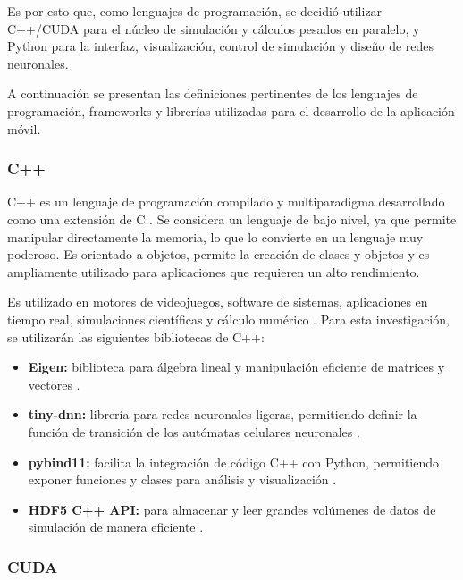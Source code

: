 Es por esto que, como lenguajes de programación, se decidió utilizar C++/CUDA para el núcleo de simulación y cálculos pesados en paralelo, y Python para la interfaz, visualización, control de simulación y diseño de redes neuronales. 

A continuación se presentan las definiciones pertinentes de los lenguajes de programación, frameworks y librerías utilizadas para el desarrollo de la aplicación móvil.

\subsubsection{C++}

C++ es un lenguaje de programación compilado y multiparadigma desarrollado como una extensión de C \cite{c_1}. Se considera un lenguaje de bajo nivel, ya que permite manipular directamente la memoria, lo que lo convierte en un lenguaje muy poderoso. Es orientado a objetos, permite la creación de clases y objetos y es ampliamente utilizado para aplicaciones que requieren un alto rendimiento.

Es utilizado en motores de videojuegos, software de sistemas, aplicaciones en tiempo real, simulaciones científicas y cálculo numérico \cite{c_2}. Para esta investigación, se utilizarán las siguientes bibliotecas de C++:

\begin{itemize}
	
	\item \textbf{Eigen:} biblioteca para álgebra lineal y manipulación eficiente de matrices y vectores \cite{eigen}.
	
	\item \textbf{tiny-dnn:} librería para redes neuronales ligeras, permitiendo definir la función de transición de los autómatas celulares neuronales \cite{tiny_dnn}.
	
	\item \textbf{pybind11:} facilita la integración de código C++ con Python, permitiendo exponer funciones y clases para análisis y visualización \cite{pybind}.
	
	\item \textbf{HDF5 C++ API:} para almacenar y leer grandes volúmenes de datos de simulación de manera eficiente \cite{hdf5}.
	
\end{itemize}

\subsubsection{CUDA}

